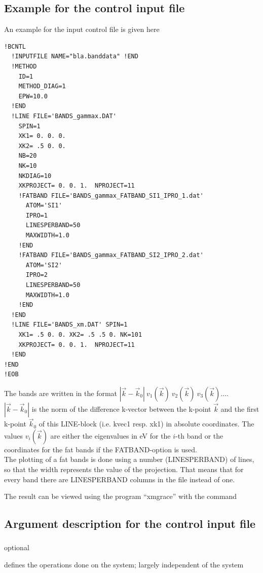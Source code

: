 \documentclass[final,12pt]{article}
\newcommand{\block}[1]{\subsubsection[#1]{\shabox{\bf #1}}}
\newcommand{\brules}[1]{
\makebox[1in][l]{Rules:}\parbox[t]{110mm}{#1}\hfill\break\hfill}
\newcommand{\bdescr}[1]{
\makebox[1in][l]{Description:}\parbox[t]{110mm}{#1}\hfill\break}
\begin{document}
{{{\subsection{Example for the control input file}
An example for the input control file is given here
\begin{verbatim}
!BCNTL
  !INPUTFILE NAME="bla.banddata" !END
  !METHOD
    ID=1
    METHOD_DIAG=1
    EPW=10.0
  !END
  !LINE FILE='BANDS_gammax.DAT' 
    SPIN=1
    XK1= 0. 0. 0. 
    XK2= .5 0. 0. 
    NB=20
    NK=10
    NKDIAG=10
    XKPROJECT= 0. 0. 1.  NPROJECT=11 
    !FATBAND FILE='BANDS_gammax_FATBAND_SI1_IPRO_1.dat'
      ATOM='SI1'
      IPRO=1
      LINESPERBAND=50
      MAXWIDTH=1.0
    !END
    !FATBAND FILE='BANDS_gammax_FATBAND_SI2_IPRO_2.dat'
      ATOM='SI2'
      IPRO=2
      LINESPERBAND=50
      MAXWIDTH=1.0
    !END
  !END
  !LINE FILE='BANDS_xm.DAT' SPIN=1
    XK1= .5 0. 0. XK2= .5 .5 0. NK=101 
    XKPROJECT= 0. 0. 1.  NPROJECT=11 
  !END
!END
!EOB
\end{verbatim}

The bands are written in the format $|\vec k-\vec k_0|\ v_1(\vec k)\ v_2(\vec k)\ v_3(\vec k) \ldots $.\\
 $|\vec k-\vec k_0|$ is the norm of the difference k-vector between the k-point $\vec k$
 and the first k-point $\vec k_0$ of this LINE-block (i.e. kvec1 resp. xk1)
in absolute coordinates. The values $v_i(\vec k)$
are either the eigenvalues in eV for the $i$-th band or the coordinates 
for the fat bands if the FATBAND-option is used.\\
The plotting of a fat bands is done using a number (LINESPERBAND) of lines,
so that the width represents the value of the projection. That means that
for every band there are LINESPERBAND columns in the file instead of one.

The result can be viewed using the program ``xmgrace'' with the
command

\bigskip{}\bigskip


\subsection{Argument description for the control input file}

\block{!BCNTL}
\brules{optional}
\bdescr{defines the operations done on the system; 
largely independent of the system}

}}}
\end{document}
